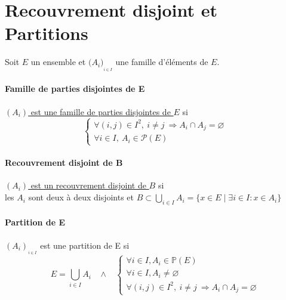 	\section{Recouvrement disjoint et Partitions}
	Soit $E$ un ensemble et $\big(A_i \big)_{_{i\in I}}$ une famille d'éléments de $E$.
		\traitd
		\paragraph{Famille de parties disjointes de E}
			\underline{$(A_i)$ est une famille de parties disjointes de $E$} si 
			\[\left\{ \begin{array}{l} \forall (i,j)\in I^2,~i\neq j~\Rightarrow A_i\cap A_j=\varnothing \\ \forall i\in I,~A_i \in \mathcal{P}(E)
			\end{array} \right. \] \vspace*{-0.7cm} \trait ${}$ \vspace*{-1.4cm} \traitd
		\paragraph{Recouvrement disjoint de B}
			\underline{$(A_i)$ est un recouvrement disjoint de $B$} si \vspace*{0.3cm}\\ les $A_i$ sont deux à deux disjoints et 
			$B\subset \bigcup\limits_{i\in I} A_i = \{x\in E \mid\exists i\in I : x\in A_i\}$ \trait ${}$ \vspace*{-1.4cm} \traitd
		\paragraph{Partition de E}\label{def partition}
			$(A_i)_{_{i\in I}}$  est une partition de E si
			\[E=\bigcup\limits_{i\in I} A_i  ~~~~\wedge ~~~~
			\left\{ \begin{array}{l} \forall i\in I, A_i \in \mathbb{P}(E)\\
			\forall i\in I, A_i \neq \varnothing\\
			\forall (i,j)\in I^2,~i\neq j~\Rightarrow A_i\cap A_j=\varnothing \end{array} \right.\] \vspace*{-0.7cm} \trait
